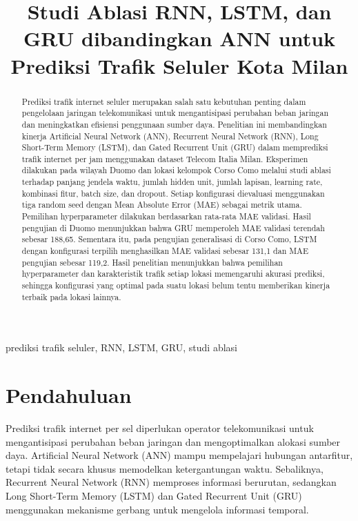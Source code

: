 \documentclass[conference,a4paper]{IEEEtran}
\begin{document}
\title{Studi Ablasi RNN, LSTM, dan GRU dibandingkan ANN untuk Prediksi Trafik Seluler Kota Milan}

\author{
\and
}

\maketitle

\begin{abstract}
Prediksi trafik internet seluler merupakan salah satu kebutuhan penting dalam pengelolaan jaringan telekomunikasi untuk mengantisipasi perubahan beban jaringan dan meningkatkan efisiensi penggunaan sumber daya. Penelitian ini membandingkan kinerja Artificial Neural Network (ANN), Recurrent Neural Network (RNN), Long Short-Term Memory (LSTM), dan Gated Recurrent Unit (GRU) dalam memprediksi trafik internet per jam menggunakan dataset Telecom Italia Milan. Eksperimen dilakukan pada wilayah Duomo dan lokasi kelompok Corso Como melalui studi ablasi terhadap panjang jendela waktu, jumlah hidden unit, jumlah lapisan, learning rate, kombinasi fitur, batch size, dan dropout. Setiap konfigurasi dievaluasi menggunakan tiga random seed dengan Mean Absolute Error (MAE) sebagai metrik utama. Pemilihan hyperparameter dilakukan berdasarkan rata-rata MAE validasi. Hasil pengujian di Duomo menunjukkan bahwa GRU memperoleh MAE validasi terendah sebesar 188,65. Sementara itu, pada pengujian generalisasi di Corso Como, LSTM dengan konfigurasi terpilih menghasilkan MAE validasi sebesar 131,1 dan MAE pengujian sebesar 119,2. Hasil penelitian menunjukkan bahwa pemilihan hyperparameter dan karakteristik trafik setiap lokasi memengaruhi akurasi prediksi, sehingga konfigurasi yang optimal pada suatu lokasi belum tentu memberikan kinerja terbaik pada lokasi lainnya.
\end{abstract}

\begin{IEEEkeywords}
prediksi trafik seluler, RNN, LSTM, GRU, studi ablasi
\end{IEEEkeywords}

\section{Pendahuluan}
Prediksi trafik internet per sel diperlukan operator telekomunikasi untuk mengantisipasi perubahan beban jaringan dan mengoptimalkan alokasi sumber daya. Artificial Neural Network (ANN) mampu mempelajari hubungan antarfitur, tetapi tidak secara khusus memodelkan ketergantungan waktu. Sebaliknya, Recurrent Neural Network (RNN) memproses informasi berurutan, sedangkan Long Short-Term Memory (LSTM) \cite{hochreiter1997lstm} dan Gated Recurrent Unit (GRU) \cite{cho2014gru} menggunakan mekanisme gerbang untuk mengelola informasi temporal.
\end{document}
